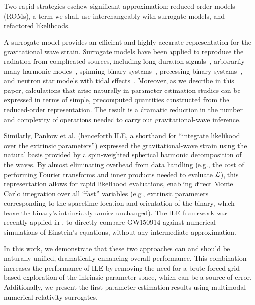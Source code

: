 \documentclass[aps,prd,nofootinbib,showpacs,amssymb,twocolumn]{revtex4}
\newcommand\ILE{ILE}
\begin{document}
Two rapid strategies eschew significant approximation: reduced-order models (ROMs), a term we shall use interchangeably with surrogate models, and refactored likelihoods. 

A surrogate
model provides an efficient and highly accurate representation for the gravitational wave strain.
%
Surrogate models  have been applied to reproduce the radiation from
complicated sources, including long duration signals~\cite{2014PhRvX...4c1006F,2014CQGra..31s5010P}, arbitrarily many
harmonic modes~\cite{2014PhRvX...4c1006F,gwastro-approx-ROMNR-Blackman2015}, spinning binary systems~\cite{2014CQGra..31s5010P,purrer2016frequency}, precessing binary systems~\cite{blackman:4d2s,2016PhRvD..94d4031S}, and neutron star models with tidal effects~\cite{lackey2016effective}.
Moreover, as we describe in this paper, 
%
calculations that arise naturally in parameter estimation studies
can be 
%
expressed in terms of simple, precomputed quantities
constructed from the reduced-order representation.
The result is a dramatic reduction in
%
the number and complexity of operations needed to carry out 
gravitational-wave inference.
%

Similarly, Pankow et
al. \cite{gwastro-PE-AlternativeArchitectures} (henceforth \ILE, a shorthand for ``integrate likelihood over the extrinsic parameters'') expressed the gravitational-wave
strain using the natural basis
%
provided by a spin-weighted spherical harmonic decomposition of the waves.  By almost
eliminating overhead from data handling (e.g., the cost of performing Fourier transforms and inner products needed to evaluate ${\cal L}$), this
representation allows for
%
rapid likelihood evaluations, enabling direct Monte Carlo integration over all ``fast''
 variables (e.g., extrinsic parameters corresponding to the spacetime location and orientation of the binary, which
   leave the binary's intrinsic dynamics unchanged).
%
The ILE framework was recently applied in
\cite{NRPaper}, to directly compare GW150914
%
against 
%
numerical simulations of Einstein's
equations, without any intermediate approximation.   

%

In this work, we demonstrate that these two approaches can and should be naturally unified, dramatically enhancing 
overall performance. 
This combination increases the performance of \ILE{} by removing the need for a brute-forced grid-based exploration of the
  intrinsic parameter space, which can be a source of error.
%
%
%
%
Additionally, we present the first parameter estimation results using multimodal numerical relativity
surrogates.
\end{document}
